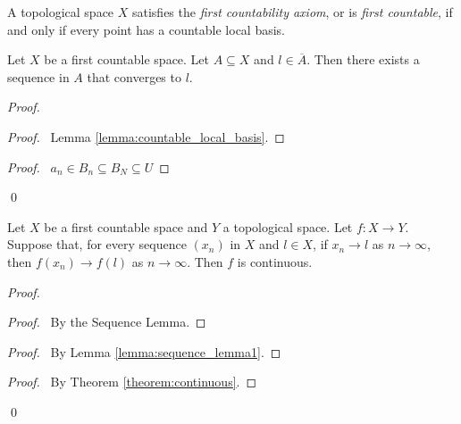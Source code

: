 \begin{definition}
    A topological space $X$ satisfies the \emph{first countability axiom}, or is \emph{first countable}, if and only if every point has a countable local basis.
\end{definition}

\begin{lemma}
    Let $X$ be a first countable space. Let $A \subseteq X$ and $l \in \overline{A}$.
    Then there exists a sequence in $A$ that converges to $l$.
\end{lemma}

\begin{proof}
    \pf
    \begin{proof}
        \pf\ Lemma \ref{lemma:countable_local_basis}.
    \end{proof}
    \begin{proof}
        \pf\ $a_n \in B_n \subseteq B_N \subseteq U$
    \end{proof}
    \qed
\end{proof}

\begin{theorem}[CC]
    Let $X$ be a first countable space and $Y$ a topological space. Let $f : X \rightarrow Y$. Suppose that, for every sequence $(x_n)$ in $X$ and $l \in X$, if $x_n \rightarrow l$
    as $n \rightarrow \infty$, then $f(x_n) \rightarrow f(l)$ as $n \rightarrow \infty$. Then $f$ is continuous.
\end{theorem}

\begin{proof}
    \pf
    \begin{proof}
        \pf\ By the Sequence Lemma.
    \end{proof}
    \begin{proof}
        \pf\ By Lemma \ref{lemma:sequence_lemma1}.
    \end{proof}
    \qedstep
    \begin{proof}
        \pf\ By Theorem \ref{theorem:continuous}.
    \end{proof}
    \qed
\end{proof}


